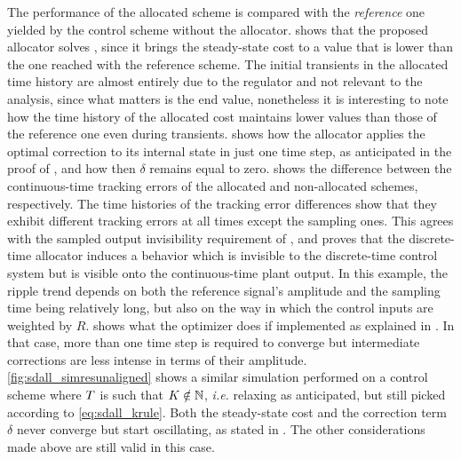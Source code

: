 \begin{example}
  The performance of the allocated scheme is compared with the \emph{reference} one yielded by the control scheme without the allocator.  shows that the proposed allocator solves , since it brings the steady-state cost to a value that is lower than the one reached with the reference scheme. The initial transients in the allocated time history are almost entirely due to the regulator and not relevant to the analysis, since what matters is the end value, nonetheless it is interesting to note how the time history of the allocated cost maintains lower values than those of the reference one even during transients.
   shows how the allocator applies the optimal correction to its internal state in just one time step, as anticipated in the proof of , and how then $\delta$ remains equal to zero.
   shows the difference between the continuous-time tracking errors of the allocated and non-allocated schemes, respectively. The time histories of the tracking error differences show that they exhibit different tracking errors at all times except the sampling ones. This agrees with the sampled output invisibility requirement of , and proves that the discrete-time allocator induces a behavior which is invisible to the discrete-time control system but is visible onto the continuous-time plant output. In this example, the ripple trend depends on both the reference signal's amplitude and the sampling time being relatively long, but also on the way in which the control inputs are weighted by $R$.
   shows what the optimizer does if implemented as explained in . In that case, more than one time step is required to converge but intermediate corrections are less intense in terms of their amplitude.
  \cref{fig:sdall_simresunaligned} shows a similar simulation performed on a control scheme where $T$ is such that $K\notin\mathbb{N}$, \emph{i.e.} relaxing  as anticipated, but still picked according to \eqref{eq:sdall_krule}. Both the steady-state cost and the correction term $\delta$ never converge but start oscillating, as stated in . The other considerations made above are still valid in this case.\closeexample
\end{example}
